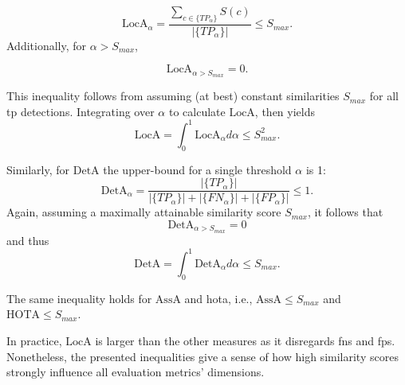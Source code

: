 \documentclass[headsepline, hidelinks, footsepline, footinclude=false, oneside, fontsize=11pt, paper=a4, listof=totoc, bibliography=totoc]{scrbook}
\begin{document}
\begin{equation}
\text{LocA}_\alpha = \frac{\sum_{c \in \{TP_\alpha\}}S(c)}{|\{TP_\alpha\}|} \leq S_{max}.
\end{equation}
Additionally, for \(\alpha > S_{max}\),

\begin{equation}
\text{LocA}_{\alpha > S_{max}} = 0.
\end{equation}

This inequality follows from assuming (at best) constant similarities \(S_{max}\) for all \gls{tp} detections.
Integrating over \(\alpha\) to calculate \(\text{LocA}\), then yields 
\begin{equation}
\text{LocA} = \int_0^1\text{LocA}_\alpha d\alpha \leq S_{max}^2.
\end{equation}

Similarly, for \(\text{DetA}\) the upper-bound for a single threshold \(\alpha\) is 1: 
\begin{equation}
    \text{DetA}_\alpha = \frac{|\{TP_\alpha\}|}{|\{TP_\alpha\}|+|\{FN_\alpha\}|+|\{FP_\alpha\}|} \leq 1.
\end{equation}
Again, assuming a maximally attainable similarity score \(S_{max}\), it follows that 
\begin{equation}
\text{DetA}_{\alpha > S_{max}} = 0
\end{equation}
and thus 
\begin{equation}
 \text{DetA} = \int_0^1\text{DetA}_\alpha d\alpha \leq S_{max}.
\end{equation}

The same inequality holds for \(\text{AssA}\) and \gls{hota}, i.e., \(\text{AssA} \leq S_{max}\) and \(\text{HOTA} \leq S_{max}\).

In practice, \(\text{LocA}\) is larger than the other measures as it disregards \glspl{fn} and \glspl{fp}. 
Nonetheless, the presented inequalities give a sense of how high similarity scores strongly influence all evaluation metrics' dimensions.
\end{document}
